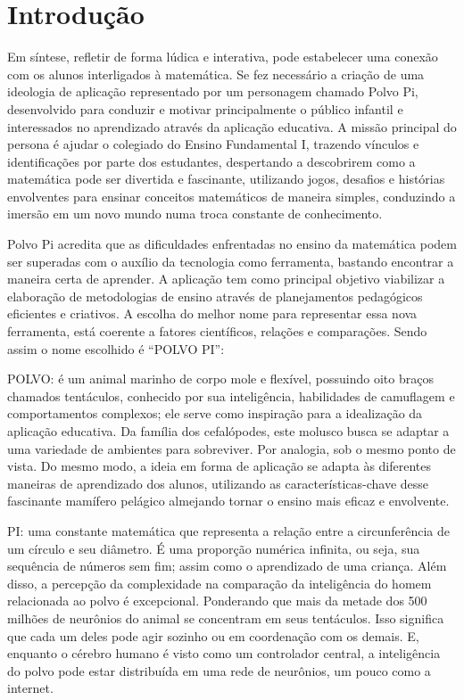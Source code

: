 \chapter{Introdução}\label{chp:intro}

Em síntese, refletir de forma lúdica e interativa, pode estabelecer uma conexão com os alunos interligados à matemática. Se fez necessário a criação de uma ideologia de  aplicação representado por um personagem chamado Polvo Pi, desenvolvido para conduzir e motivar principalmente o público infantil e interessados no aprendizado através da aplicação educativa. A missão principal do persona é ajudar o colegiado do Ensino Fundamental I, trazendo vínculos e identificações por parte dos estudantes, despertando a descobrirem como a matemática pode ser divertida e fascinante, utilizando jogos, desafios e histórias envolventes para ensinar conceitos matemáticos de maneira simples, conduzindo a imersão em um novo mundo numa troca constante de conhecimento. \cite{Lopes2020}

Polvo Pi acredita que as dificuldades enfrentadas no ensino da matemática podem ser superadas com o auxílio da tecnologia como ferramenta, bastando encontrar a maneira certa de aprender. A aplicação tem como principal objetivo viabilizar a elaboração de metodologias de ensino através de planejamentos pedagógicos eficientes e criativos. A escolha do melhor nome para representar essa nova ferramenta, está coerente a fatores científicos, relações e comparações. Sendo assim o nome escolhido é “POLVO PI”:

POLVO: é um animal marinho de corpo mole e flexível, possuindo oito braços chamados tentáculos, conhecido por sua inteligência, habilidades de camuflagem e comportamentos complexos; ele serve como inspiração para a idealização da aplicação educativa. Da família dos cefalópodes, este molusco busca se adaptar a uma variedade de ambientes para sobreviver. Por analogia, sob o mesmo ponto de vista. Do mesmo modo, a ideia em forma de aplicação se adapta às diferentes maneiras de aprendizado dos alunos, utilizando as características-chave desse fascinante mamífero pelágico almejando tornar o ensino mais eficaz e envolvente.\cite{BBC2023}

PI: uma constante matemática que representa a relação entre a circunferência de um círculo e seu diâmetro. É uma proporção numérica infinita, ou seja, sua sequência de números sem fim; assim como o aprendizado de uma criança. Além disso, a percepção da complexidade na comparação da inteligência do homem relacionada ao polvo é excepcional. Ponderando que mais da metade dos 500 milhões de neurônios do animal se concentram em seus tentáculos. Isso significa que cada um deles pode agir sozinho ou em coordenação com os demais. E, enquanto o cérebro humano é visto como um controlador central, a inteligência do polvo pode estar distribuída em uma rede de neurônios, um pouco como a internet. \cite{BrasilEscola2023}



